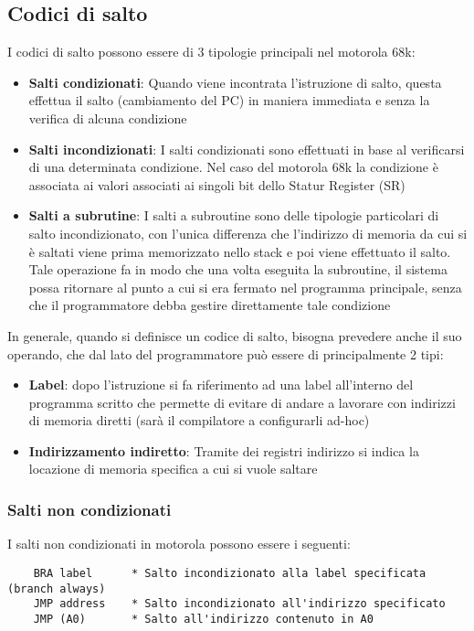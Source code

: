 \subsection{Codici di salto} \label{par:salto}

I codici di salto possono essere di 3 tipologie principali nel motorola 68k:
\begin{itemize}
    \item \textbf{Salti condizionati}: Quando viene incontrata l'istruzione di salto, questa effettua il salto (cambiamento del PC) in maniera immediata e senza la verifica di alcuna condizione

    \item \textbf{Salti incondizionati}: I salti condizionati sono effettuati in base al verificarsi di una determinata condizione. Nel caso del motorola 68k la condizione è associata ai valori associati ai singoli bit dello Statur Register (SR)

    \item \textbf{Salti a subrutine}: I salti a subroutine sono delle tipologie particolari di salto incondizionato, con l'unica differenza che l'indirizzo di memoria da cui si è saltati viene prima memorizzato nello stack e poi viene effettuato il salto. Tale operazione fa in modo che una volta eseguita la subroutine, il sistema possa ritornare al punto a cui si era fermato nel programma principale, senza che il programmatore debba gestire direttamente tale condizione
\end{itemize}

In generale, quando si definisce un codice di salto, bisogna prevedere anche il suo operando, che dal lato del programmatore può essere di principalmente 2 tipi:
\begin{itemize}
    \item \textbf{Label}: dopo l'istruzione si fa riferimento ad una label all'interno del programma scritto che permette di evitare di andare a lavorare con indirizzi di memoria diretti (sarà il compilatore a configurarli ad-hoc)

    \item \textbf{Indirizzamento indiretto}: Tramite dei registri indirizzo si indica la locazione di memoria specifica a cui si vuole saltare
\end{itemize}

\newpage
\subsubsection{Salti non condizionati}
I salti non condizionati in motorola possono essere i seguenti:
\begin{lstlisting}
    BRA label      * Salto incondizionato alla label specificata (branch always)
    JMP address    * Salto incondizionato all'indirizzo specificato
    JMP (A0)       * Salto all'indirizzo contenuto in A0
\end{lstlisting}

